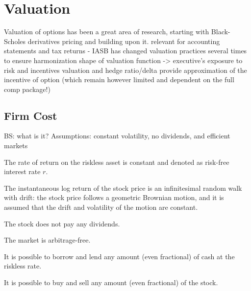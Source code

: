 \section{Valuation}
Valuation of options has been a great area of research, starting with Black-Scholes derivatives pricing and building upon it.
    relevant for accounting statements and tax returns - IASB has changed valuation practices several times to ensure harmonization
    shape of valuation function -> executive's exposure to risk and incentives
    valuation and hedge ratio/delta provide approximation of the incentive of option (which remain however limited and dependent on the full comp package!)


\subsection{Firm Cost} 

BS: what is it?
    Assumptions: constant volatility, no dividends, and efficient markets

    \begin{assumption}
        The rate of return on the riskless asset is constant and denoted as risk-free interest rate $r$.
    \end{assumption}
        
    \begin{assumption}
        The instantaneous log return of the stock price is an infinitesimal random walk with drift: the stock price follows a geometric Brownian motion, and it is assumed that the drift and volatility of the motion are constant.
    \end{assumption}

    \begin{assumption}
        The stock does not pay any dividends.
    \end{assumption}

    \begin{assumption}
        The market is arbitrage-free.
    \end{assumption}

    \begin{assumption}
        It is possible to borrow and lend any amount (even fractional) of cash at the riskless rate.
    \end{assumption}

    \begin{assumption}
        It is possible to buy and sell any amount (even fractional) of the stock.
    \end{assumption}
    
